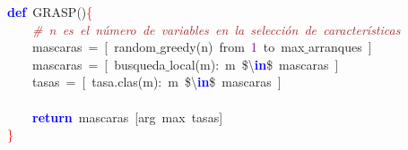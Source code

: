 \noindent
\mbox{}\textbf{\textcolor{Blue}{def}}\ GRASP\textcolor{BrickRed}{()}\textcolor{Red}{\{} \\
\mbox{}\ \ \ \ \textit{\textcolor{Brown}{\#\ n\ es\ el\ número\ de\ variables\ en\ la\ selección\ de\ características}} \\
\mbox{}\ \ \ \ mascaras\ \textcolor{BrickRed}{=}\ \textcolor{BrickRed}{[}\ random$\_$greedy\textcolor{BrickRed}{(}n\textcolor{BrickRed}{)}\ from\ \textcolor{Purple}{1}\ to\ max$\_$arranques\ \textcolor{BrickRed}{]} \\
\mbox{}\ \ \ \ mascaras\ \textcolor{BrickRed}{=}\ \textcolor{BrickRed}{[}\ busqueda$\_$local\textcolor{BrickRed}{(}m\textcolor{BrickRed}{):}\ m\ \$\textcolor{BrickRed}{\textbackslash{}}\textbf{\textcolor{Blue}{in}}\$\ mascaras\ \textcolor{BrickRed}{]} \\
\mbox{}\ \ \ \ tasas\ \textcolor{BrickRed}{=}\ \textcolor{BrickRed}{[}\ tasa\textcolor{BrickRed}{.}clas\textcolor{BrickRed}{(}m\textcolor{BrickRed}{):}\ m\ \$\textcolor{BrickRed}{\textbackslash{}}\textbf{\textcolor{Blue}{in}}\$\ mascaras\ \textcolor{BrickRed}{]} \\
\mbox{} \\
\mbox{}\ \ \ \ \textbf{\textcolor{Blue}{return}}\ mascaras\ \textcolor{BrickRed}{[}arg\ max\ tasas\textcolor{BrickRed}{]} \\
\mbox{}\textcolor{Red}{\}} \\
\mbox{}

